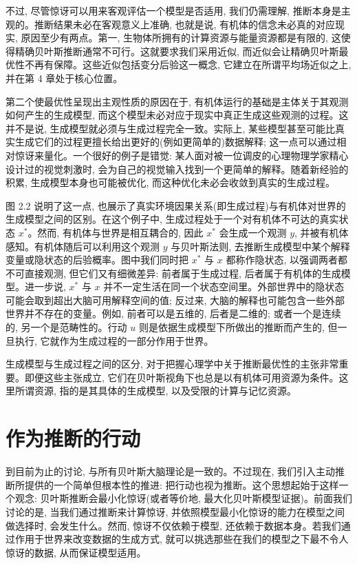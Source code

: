 不过, 尽管惊讶可以用来客观评估一个模型是否适用, 我们仍需理解, 推断本身是主观的。推断结果未必在客观意义上准确, 也就是说, 有机体的信念未必真的对应现实, 原因至少有两点。第一, 生物体所拥有的计算资源与能量资源都是有限的, 这使得精确贝叶斯推断通常不可行。这就要求我们采用近似, 而近似会让精确贝叶斯最优性不再有保障。这些近似包括变分后验这一概念, 它建立在所谓平均场近似之上, 并在第 4 章处于核心位置。

第二个使最优性呈现出主观性质的原因在于, 有机体运行的基础是主体关于其观测如何产生的生成模型, 而这个模型未必对应于现实中真正生成这些观测的过程。这并不是说, 生成模型就必须与生成过程完全一致。实际上, 某些模型甚至可能比真实生成它们的过程更擅长给出更好的(例如更简单的)数据解释; 这一点可以通过相对惊讶来量化。一个很好的例子是错觉: 某人面对被一位调皮的心理物理学家精心设计过的视觉刺激时, 会为自己的视觉输入找到一个更简单的解释。随着新经验的积累, 生成模型本身也可能被优化, 而这种优化未必会收敛到真实的生成过程。

图 2.2 说明了这一点, 也展示了真实环境因果关系(即生成过程)与有机体对世界的生成模型之间的区别。在这个例子中, 生成过程处于一个对有机体不可达的真实状态 $x^\ast$。然而, 有机体与世界是相互耦合的, 因此 $x^\ast$ 会生成一个观测 $y$, 并被有机体感知。有机体随后可以利用这个观测 $y$ 与贝叶斯法则, 去推断生成模型中某个解释变量或隐状态的后验概率。图中我们同时把 $x^\ast$ 与 $x$ 都称作隐状态, 以强调两者都不可直接观测, 但它们又有细微差异: 前者属于生成过程, 后者属于有机体的生成模型。进一步说, $x^\ast$ 与 $x$ 并不一定生活在同一个状态空间里。外部世界中的隐状态可能会取到超出大脑可用解释空间的值; 反过来, 大脑的解释也可能包含一些外部世界并不存在的变量。例如, 前者可以是五维的, 后者是二维的; 或者一个是连续的, 另一个是范畴性的。行动 $u$ 则是依据生成模型下所做出的推断而产生的, 但一旦执行, 它就作为生成过程的一部分作用于世界。

生成模型与生成过程之间的区分, 对于把握心理学中关于推断最优性的主张非常重要。即便这些主张成立, 它们在贝叶斯视角下也总是以有机体可用资源为条件。这里所谓资源, 指的是其具体的生成模型, 以及受限的计算与记忆资源。

\section{作为推断的行动}

到目前为止的讨论, 与所有贝叶斯大脑理论是一致的。不过现在, 我们引入主动推断所提供的一个简单但根本性的推进: 把行动也视为推断。这个思想起始于这样一个观念: 贝叶斯推断会最小化惊讶(或者等价地, 最大化贝叶斯模型证据)。前面我们讨论的是, 当我们通过推断来计算惊讶, 并依照模型最小化惊讶的能力在模型之间做选择时, 会发生什么。然而, 惊讶不仅依赖于模型, 还依赖于数据本身。若我们通过作用于世界来改变数据的生成方式, 就可以挑选那些在我们的模型之下最不令人惊讶的数据, 从而保证模型适用。

